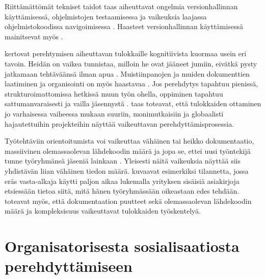\documentclass[utf8]{gradu3}
\begin{document}
Riittämättömät tekniset taidot taas aiheuttavat ongelmia versionhallinnan käyttämisessä, ohjelmistojen testaamisessa ja vaikeuksia laajassa ohjelmistokoodissa navigoimisessa \parencite{begel-simon-2008}. Haasteet versionhallinnan käyttämisessä mainitsevat myös \textcite{radermacher-ym-2015}.

\textcite{begel-simon-2008} kertovat perehtymisen aiheuttavan tulokkaille kognitiivista kuormaa usein eri tavoin. Heidän on vaikea tunnistaa, milloin he ovat jääneet jumiin, eivätkä pysty jatkamaan tehtäväänsä ilman apua \parencite{begel-simon-2008}. Muistiinpanojen ja muiden dokumenttien laatiminen ja organisointi on myös haastavaa %
\parencites%
    {begel-simon-2008}%
    {radermacher-ym-2015}%
\relax.
%
Jos perehdytys tapahtuu pienissä, strukturoimattomissa hetkissä muun työn ohella, oppiminen tapahtuu sattumanvaraisesti ja vailla jäsennystä \parencite{begel-simon-2008}. \textcite{britto-ym-2019} taas toteavat, että tulokkaiden ottaminen jo varhaisessa vaiheessa mukaan suuriin, monimutkaisiin ja globaalisti hajautettuihin projekteihin näyttää vaikeuttavan perehdyttämisprosessia.

Työtehtäviin orientoitumista voi vaikeuttaa vähäinen tai heikko dokumentaatio, massiivinen olemassaolevan lähdekoodin määrä ja jopa se, ettei uusi työntekijä tunne työryhmänsä jäseniä lainkaan \parencite{begel-simon-2008}. Yleisesti näitä vaikeuksia näyttää siis yhdistävän liian vähäinen tiedon määrä. \textcite{begel-simon-2008} kuvaavat esimerkiksi tilannetta, jossa eräs vasta-alkaja käytti paljon aikaa lukemalla yrityksen sisäisiä asiakirjoja etsiessään tietoa siitä, mitä hänen työryhmässään oikeastaan edes tehdään. \textcite{britto-ym-2019} toteavat myös, että dokumentaation puutteet sekä olemassaolevan lähdekoodin määrä ja kompleksisuus vaikeuttavat tulokkaiden työskentelyä.


\section{Organisatorisesta sosialisaatiosta perehdyttämiseen}
\end{document}
